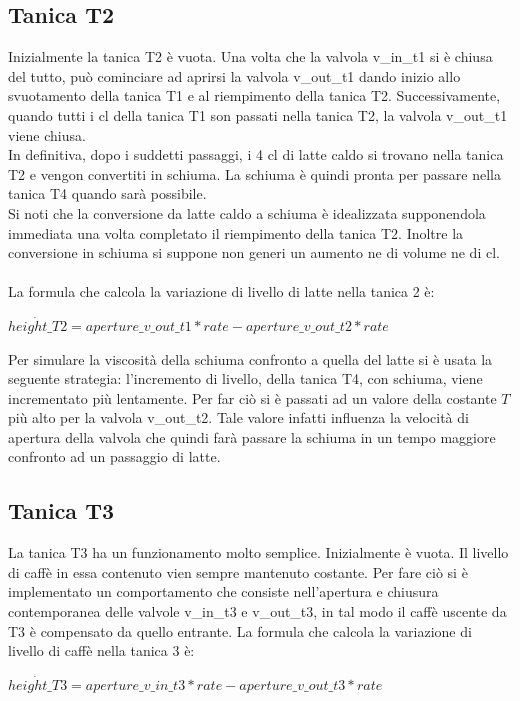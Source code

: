 \documentclass[12pt]{article}
\begin{document}
\subsection{Tanica T2}
Inizialmente la tanica T2 è vuota. Una volta che la valvola v\_in\_t1 si è chiusa del tutto, può cominciare ad aprirsi la valvola v\_out\_t1 dando inizio allo svuotamento della tanica T1 e al riempimento della tanica T2. Successivamente, quando tutti i cl della tanica T1 son passati nella tanica T2, la valvola v\_out\_t1 viene chiusa.\\
In definitiva, dopo i suddetti passaggi, i 4 cl di latte caldo si trovano nella tanica T2 e vengon convertiti in schiuma. La schiuma è quindi pronta per passare nella tanica T4 quando sarà possibile.\\
Si noti che la conversione da latte caldo a schiuma è idealizzata supponendola immediata una volta completato il riempimento della tanica T2. Inoltre la conversione in schiuma si suppone non generi un aumento ne di volume ne di cl. \\\\
La formula che calcola la variazione di livello di latte nella tanica 2 è:
\begin{center}
$ \dot{height\_T2} = aperture\_v\_out\_t1*rate - aperture\_v\_out\_t2*rate$
\end{center}
Per simulare la viscosità della schiuma confronto a quella del latte si è usata la seguente strategia:
l'incremento di livello, della tanica T4, con schiuma, viene incrementato più lentamente. Per far ciò si è passati ad un valore della costante $T$ più alto per la valvola v\_out\_t2. Tale valore infatti influenza la velocità di apertura della valvola che quindi farà passare la schiuma in un tempo maggiore confronto ad un passaggio di latte.


\subsection{Tanica T3}
La tanica T3 ha un funzionamento molto semplice. Inizialmente è vuota. Il livello di caffè in essa contenuto vien sempre mantenuto costante. Per fare ciò si è implementato un comportamento che consiste nell'apertura e chiusura contemporanea delle valvole v\_in\_t3 e v\_out\_t3, in tal modo il caffè uscente da T3 è compensato da quello entrante.
La formula che calcola la variazione di livello di caffè nella tanica 3 è:
\begin{center}
$ \dot{height\_T3} = aperture\_v\_in\_t3*rate - aperture\_v\_out\_t3*rate$
\end{center}
\end{document}
